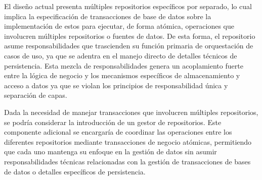El diseño actual presenta múltiples repositorios específicos por separado, lo cual implica la especificación de transacciones de base de datos sobre la implementación de estos para ejecutar, de forma atómica, operaciones que involucren múltiples repositorios o fuentes de datos. De esta forma, el repositorio asume responsabilidades que trascienden su función primaria de orquestación de casos de uso, ya que se adentra en el manejo directo de detalles técnicos de persistencia. Esta mezcla de responsabilidades genera un acoplamiento fuerte entre la lógica de negocio y los mecanismos específicos de almacenamiento y acceso a datos ya que se violan los principios de responsabilidad única y separación de capas.

Dada la necesidad de manejar transacciones que involucren múltiples repositorios, se podría considerar la introducción de un gestor de repositorios. Este componente adicional se encargaría de coordinar las operaciones entre los diferentes repositorios mediante transacciones de negocio atómicas, permitiendo que cada uno mantenga su enfoque en la gestión de datos sin asumir responsabilidades técnicas relacionadas con la gestión de transacciones de bases de datos o detalles específicos de persistencia.



